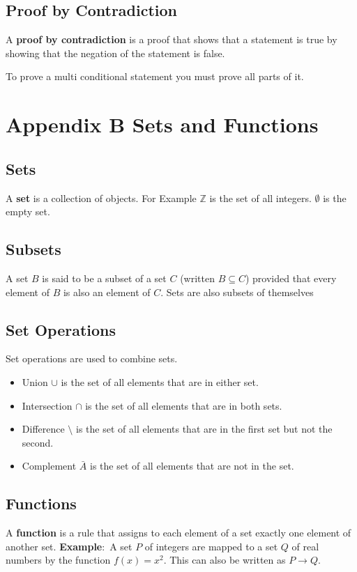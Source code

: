 \documentclass{article}
\begin{document}
\subsection*{Proof by Contradiction}
A \textbf{proof by contradiction} is a proof that shows that a statement is true by showing that the negation of the statement is false.

To prove a multi conditional statement you must prove all parts of it.

\section{Appendix B Sets and Functions}

\subsection*{Sets}
A \textbf{set} is a collection of objects.
For Example $\mathbb{Z}$ is the set of all integers.
$\emptyset$ is the empty set.

\subsection*{Subsets}
A set $B$ is said to be a subset of a set $C$ (written $B \subseteq C$) provided that every element of
$B$ is also an element of $C$. Sets are also subsets of themselves

\subsection*{Set Operations}
Set operations are used to combine sets.
\begin{itemize}
    \item Union $\cup$ is the set of all elements that are in either set.
    \item Intersection $\cap$ is the set of all elements that are in both sets.
    \item Difference $\setminus$ is the set of all elements that are in the first set but not the second.
    \item Complement $\bar{A}$ is the set of all elements that are not in the set.
\end{itemize}

\subsection*{Functions}
A \textbf{function} is a rule that assigns to each element of a set exactly one element of another set.
\textbf{Example$\colon$} A set $P$ of integers are mapped to a set $Q$ of real numbers by the function $f(x) = x^2$. This can also be written as $P \to Q$.
\end{document}
